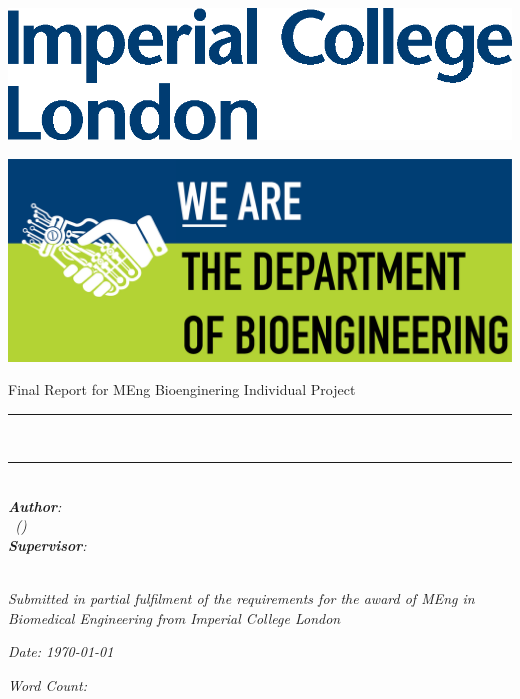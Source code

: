 \begin{titlepage}
\Large

\begin{minipage}{0.4\textwidth}
    \includegraphics[width=\textwidth]{figures/Imperial.eps}
\end{minipage}
\hfill
\begin{minipage}{0.4\textwidth}
\begin{flushright}
    \includegraphics[width=.9\textwidth]{figures/Bioeng.png}
\end{flushright}
\end{minipage}

\vspace{1.5cm}

\begin{center}
    {\huge Final Report for MEng Bioenginering Individual Project} \\ [1cm]
    \rule{\textwidth}{.1cm} \\[0.4cm]
    {\Huge \reporttitle}
    \rule{\textwidth}{.1cm} \\ [1.5cm]

    \textit{\textbf{Author}: \\ \reportauthor \ (\cid)} \\ [1cm]
    \textit{\textbf{Supervisor}: \\ \reportsupervisor} \\ [1cm]

    \vspace{2cm}

    \textit{Submitted in partial fulfilment of the requirements for the award of MEng in Biomedical Engineering from Imperial College London}

    \vfill
    
    \begin{minipage}{0.5\textwidth}
    \centering
        \textit{Date: \today} \\ [1cm]
    \end{minipage}
    \hfill
    \begin{minipage}{0.4\textwidth}
    \centering
        \textit{Word Count: \wordcount} \\ [1cm]
    \end{minipage}
\end{center}

\end{titlepage}